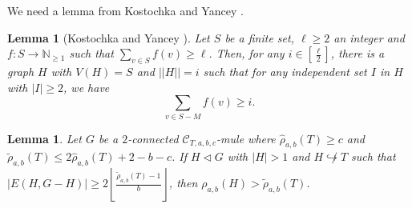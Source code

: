 \documentclass[12pt]{amsart}
\theoremstyle{plain}
\newtheorem{lem}[thm]{Lemma}
\theoremstyle{definition}
\theoremstyle{remark}
\newcommand{\fancy}[1]{\mathcal{#1}}
\newcommand{\C}{\fancy{C}}
\newcommand{\IN}{\mathbb{N}}
\newcommand{\inj}{\hookrightarrow}
\newcommand{\card}[1]{\left|#1\right|}
\newcommand{\floor}[1]{\left\lfloor#1\right\rfloor}
\newcommand{\func}[3]{#1\colon #2 \rightarrow #3}
\newcommand{\irange}[1]{\left[#1\right]}
\begin{document}
We need a lemma from Kostochka and Yancey \cite{kostochkayancey2012ore}.

\begin{lem}[Kostochka and Yancey \cite{kostochkayancey2012ore}]\label{EdgeAddingLemma}
Let $S$ be a finite set, $\ell \ge 2$ an integer and $\func{f}{S}{\IN_{\ge 1}}$ such that $\sum_{v \in S} f(v) \ge \ell$.  Then, for any $i \in \irange{\frac{\ell}{2}}$, there is a graph $H$ with $V(H) = S$ and $||H|| = i$ such that for any independent set $I$ in $H$ with $\card{I} \ge 2$, we have \[\sum_{v \in S - M} f(v) \ge i.\]
\end{lem}

\begin{lem}
Let $G$ be a $2$-connected $\C_{T,a,b,c}$-mule where $\hat{\rho}_{a,b}(T) \ge c$ and $\tilde{\rho}_{a,b}(T) \le 2\hat{\rho}_{a,b}(T) + 2 - b - c$.  If $H \lhd G$ with $|H| > 1$ and $H \not \inj T$ such that $\card{E(H, G-H)} \ge 2\floor{\frac{\tilde{\rho}_{a,b}(T) - 1}{b}}$, then $\rho_{a,b}(H) > \tilde{\rho}_{a,b}(T)$.
\end{lem}
\end{document}
